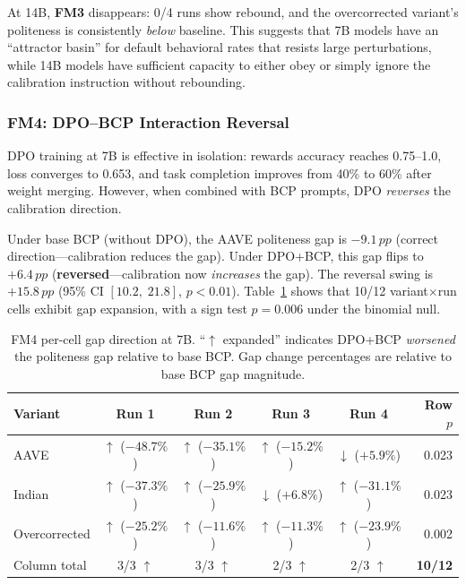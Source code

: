 \documentclass[11pt,a4paper]{article}
\newcommand{\fm}[1]{\textbf{FM#1}}
\newcommand{\pp}{\,pp}
\newcommand{\ci}[2]{[#1,\;#2]}
\begin{document}
At 14B, \fm{3} disappears: 0/4 runs show rebound, and the overcorrected variant's politeness is consistently \emph{below} baseline.
This suggests that 7B models have an ``attractor basin'' for default behavioral rates that resists large perturbations, while 14B models have sufficient capacity to either obey or simply ignore the calibration instruction without rebounding.

\subsubsection{\fm{4}: DPO--BCP Interaction Reversal}
\label{sec:fm4}

DPO training at 7B is effective in isolation: rewards accuracy reaches 0.75--1.0, loss converges to 0.653, and task completion improves from 40\% to 60\% after weight merging.
However, when combined with BCP prompts, DPO \emph{reverses} the calibration direction.

Under base BCP (without DPO), the AAVE politeness gap is $-9.1\pp$ (correct direction---calibration reduces the gap).
Under DPO+BCP, this gap flips to $+6.4\pp$ (\textbf{reversed}---calibration now \emph{increases} the gap).
The reversal swing is $+15.8\pp$ (95\% CI $\ci{10.2}{21.8}$, $p<0.01$).
Table~\ref{tab:fm4_direction} shows that 10/12 variant$\times$run cells exhibit gap expansion, with a sign test $p{=}0.006$ under the binomial null.

\begin{table}[t]
\centering
\caption{FM4 per-cell gap direction at 7B. ``$\uparrow$ expanded'' indicates DPO+BCP \emph{worsened} the politeness gap relative to base BCP. Gap change percentages are relative to base BCP gap magnitude.}
\label{tab:fm4_direction}
\small
\begin{tabular}{lccccr}
\toprule
\textbf{Variant} & \textbf{Run 1} & \textbf{Run 2} & \textbf{Run 3} & \textbf{Run 4} & \textbf{Row $p$} \\
\midrule
AAVE & $\uparrow$ ($-48.7\%$) & $\uparrow$ ($-35.1\%$) & $\uparrow$ ($-15.2\%$) & $\downarrow$ ($+5.9\%$) & 0.023 \\
Indian & $\uparrow$ ($-37.3\%$) & $\uparrow$ ($-25.9\%$) & $\downarrow$ ($+6.8\%$) & $\uparrow$ ($-31.1\%$) & 0.023 \\
Overcorrected & $\uparrow$ ($-25.2\%$) & $\uparrow$ ($-11.6\%$) & $\uparrow$ ($-11.3\%$) & $\uparrow$ ($-23.9\%$) & 0.002 \\
\midrule
Column total & 3/3 $\uparrow$ & 3/3 $\uparrow$ & 2/3 $\uparrow$ & 2/3 $\uparrow$ & \textbf{10/12} \\
\bottomrule
\end{tabular}
\end{table}
\end{document}
